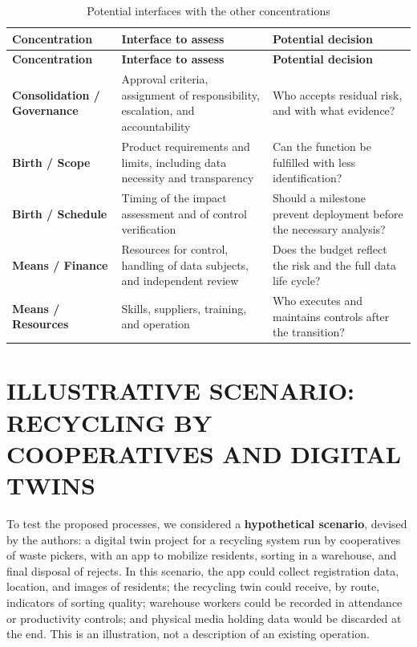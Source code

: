 \documentclass[12pt,a4paper,article,oneside,brazil,english]{abntex2}
\newcommand{\fontetab}[1]{\par\vspace{3pt}{\small\noindent Source: #1\par}}
\begin{document}
\begingroup\SingleSpacing\small
\begin{longtable}{@{}>{\raggedright\arraybackslash}p{}>{\raggedright\arraybackslash}p{}>{\raggedright\arraybackslash}p{}@{}}
\caption{Potential interfaces with the other concentrations}\label{tab:t11}\\
\hline
\textbf{Concentration} & \textbf{Interface to assess} & \textbf{Potential decision}\\
\hline
\endfirsthead
\hline
\textbf{Concentration} & \textbf{Interface to assess} & \textbf{Potential decision}\\
\hline
\endhead
\hline
\endfoot
\hline
\endlastfoot
\textbf{Consolidation / Governance} & Approval criteria, assignment of responsibility, escalation, and accountability & Who accepts residual risk, and with what evidence?\\[3pt]
\textbf{Birth / Scope} & Product requirements and limits, including data necessity and transparency & Can the function be fulfilled with less identification?\\[3pt]
\textbf{Birth / Schedule} & Timing of the impact assessment and of control verification & Should a milestone prevent deployment before the necessary analysis?\\[3pt]
\textbf{Means / Finance} & Resources for control, handling of data subjects, and independent review & Does the budget reflect the risk and the full data life cycle?\\[3pt]
\textbf{Means / Resources} & Skills, suppliers, training, and operation & Who executes and maintains controls after the transition?\\[3pt]
\end{longtable}
\endgroup
\fontetab{Prepared by the authors (2026).}

\section{ILLUSTRATIVE SCENARIO: RECYCLING BY COOPERATIVES AND DIGITAL TWINS}

To test the proposed processes, we considered a \textbf{hypothetical scenario}, devised by the authors: a digital twin project for a recycling system run by cooperatives of waste pickers, with an app to mobilize residents, sorting in a warehouse, and final disposal of rejects. In this scenario, the app could collect registration data, location, and images of residents; the recycling twin could receive, by route, indicators of sorting quality; warehouse workers could be recorded in attendance or productivity controls; and physical media holding data would be discarded at the end. This is an illustration, not a description of an existing operation.
\end{document}
